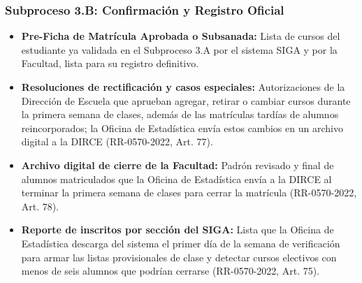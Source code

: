 \subsubsection{Subproceso 3.B: Confirmación y Registro Oficial}

\begin{itemize}
    \item \textbf{Pre-Ficha de Matrícula Aprobada o Subsanada:} Lista de cursos del estudiante ya validada en el Subproceso 3.A por el sistema SIGA y por la Facultad, lista para su registro definitivo.

    \item \textbf{Resoluciones de rectificación y casos especiales:} Autorizaciones de la Dirección de Escuela que aprueban agregar, retirar o cambiar cursos durante la primera semana de clases, además de las matrículas tardías de alumnos reincorporados; la Oficina de Estadística envía estos cambios en un archivo digital a la DIRCE (RR-0570-2022, Art. 77\textdegree{}).

    \item \textbf{Archivo digital de cierre de la Facultad:} Padrón revisado y final de alumnos matriculados que la Oficina de Estadística envía a la DIRCE al terminar la primera semana de clases para cerrar la matrícula (RR-0570-2022, Art. 78\textdegree{}).

    \item \textbf{Reporte de inscritos por sección del SIGA:} Lista que la Oficina de Estadística descarga del sistema el primer día de la semana de verificación para armar las listas provisionales de clase y detectar cursos electivos con menos de seis alumnos que podrían cerrarse (RR-0570-2022, Art. 75\textdegree{}).
\end{itemize}
